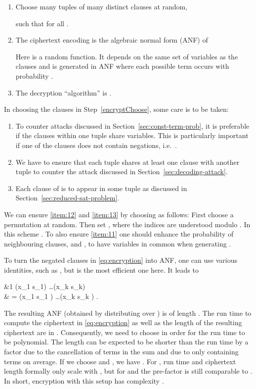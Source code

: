 \documentclass[final,journal,compsoc]{IEEEtran}
\begin{document}
\begin{enumerate}
\item \label{encryptChoose} Choose  many tuples of 
  many distinct clauses  at
  random,

such that  for all .

\item \label{item:17} The ciphertext encoding 
  is the algebraic normal form (ANF) of

Here  is a
random function. It depends on the same set of 
variables as the clauses  and is generated in ANF where each possible term occurs with probability .

\item The decryption ``algorithm'' is .
\end{enumerate}
In choosing the clauses in Step~\ref{encryptChoose}, some care is
to be taken:
\begin{enumerate}[label=(\alph*)]
\item \label{item:11} To counter attacks discussed in Section~\ref{sec:const-term-prob}, it
  is preferable if the clauses within one tuple share variables. This
  is particularly important if one of the clauses does not contain
  negations, i.e.\ .
\item \label{item:12} We have to ensure that each tuple
  shares at least one clause with another tuple to counter the attack
  discussed in Section~\ref{sec:decoding-attack}.
\item \label{item:13} Each
  clause of  is to appear in some tuple as discussed in
  Section~\ref{sec:reduced-sat-problem}.
\end{enumerate}


We can ensure \ref{item:12} and \ref{item:13} by choosing  as follows:
First choose a permutation  at random. Then set , where the
indices are understood modulo . In this scheme . 
To also ensure \ref{item:11} one should enhance the probability of
neighbouring clauses,  and  , to have
variables in common when generating .


To turn the negated clauses in \eqref{eq:encryption} into ANF, one can
use various identities, such as , but
 is the most efficient one here. It
leads to

&1 \oplus (x_1 \oplus s_1) \vee \ldots \vee (x_k \oplus s_k) \\
 & =  (x_1 \oplus s_1 ) \wedge \ldots \wedge (x_k \oplus
 s_k ) \;.
 
The resulting ANF (obtained by distributing  over ) is
of length . 
The run time to compute the ciphertext in \eqref{eq:encryption}
as well as the length of the resulting ciphertext are in . 
Consequently, we need
to choose  in order for the run time to be
polynomial.
 The length can be expected to be shorter than the run
time by a factor  due to the cancellation of terms in the sum and
due to  only
containing  terms on average.   
If we choose  and , we
have . For , run
time and ciphertext length formally only scale with , but for 
and  the pre-factor is still comparable to .
In short, encryption with this setup has complexity .
\end{document}
